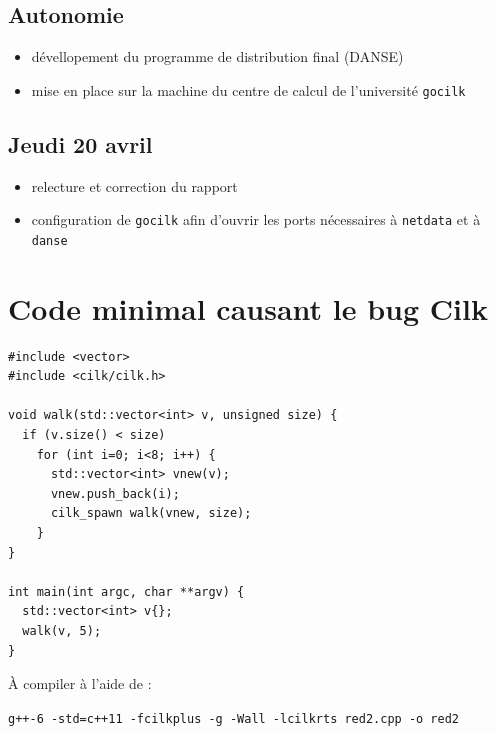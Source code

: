 \documentclass[12pt,a4paper]{report}
\begin{document}
\subsection*{Autonomie}
\begin{itemize}
	\item	dévellopement du programme de distribution final (DANSE)
	\item	mise en place sur la machine du centre de calcul de l'université \texttt{gocilk}
\end{itemize}

\subsection*{Jeudi 20 avril}
\begin{itemize}
	\item	relecture et correction du rapport
	\item	configuration de \texttt{gocilk} afin d'ouvrir les ports nécessaires à \texttt{netdata} et à \texttt{danse}
\end{itemize}

\newpage

\section{Code minimal causant le bug Cilk}
\label{anx:bugcilk}

\begin{verbatim}
#include <vector>
#include <cilk/cilk.h>

void walk(std::vector<int> v, unsigned size) {
  if (v.size() < size)
    for (int i=0; i<8; i++) {
      std::vector<int> vnew(v);
      vnew.push_back(i);
      cilk_spawn walk(vnew, size);
    }
}

int main(int argc, char **argv) {
  std::vector<int> v{};
  walk(v, 5);
}
\end{verbatim}

À compiler à l'aide de :

{\centering \texttt{g++-6 -std=c++11 -fcilkplus -g -Wall -lcilkrts red2.cpp -o red2}}
\end{document}

